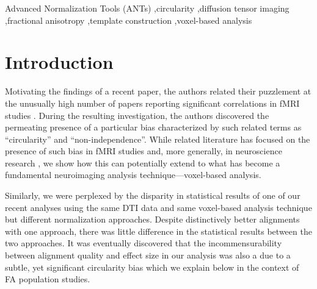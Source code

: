 \documentclass[final,5p,times,twocolumn]{elsarticle}
\begin{document}
\begin{frontmatter}
\begin{keyword}
Advanced Normalization Tools (ANTs) \sep circularity \sep diffusion tensor imaging \sep fractional anisotropy \sep template construction \sep voxel-based analysis
\end{keyword}

\end{frontmatter}
%
%
\newpage





\section{Introduction}
Motivating the findings of a recent paper, the authors related their
puzzlement at the unusually high number of papers reporting 
significant correlations in fMRI studies \cite{Vul2009}. During the 
resulting investigation, the authors discovered the permeating
presence of a particular bias characterized by such related terms as ``circularity''
and ``non-independence''.
While related literature has focused on the presence of such bias in 
fMRI studies \cite{Vul2009,Vul2010} and, more generally, in neuroscience research 
\cite{Kriegeskorte2009}, we show how this can potentially extend to what has
become a fundamental neuroimaging analysis technique---voxel-based analysis.

Similarly, we were perplexed by the disparity in statistical results of one of 
our recent analyses \cite{Stone2011} using the same DTI data and same 
voxel-based analysis technique but different normalization approaches.  Despite 
distinctively better alignments with one approach, there was little 
difference in the statistical results between the two approaches.  
It was eventually discovered that the 
incommensurability between alignment quality and effect size in our
analysis was also a due to a subtle, yet significant circularity bias
which we explain below in the context of FA population studies.  

\end{document}
